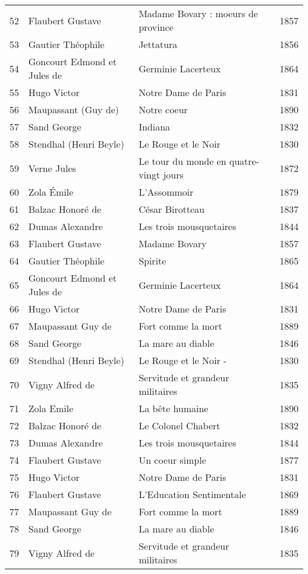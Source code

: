 \begin{center}
\begin{small}
\begin{longtable}{l l l l}
  52 & Flaubert Gustave & Madame Bovary : moeurs de province & 1857 \\
  53 & Gautier Théophile & Jettatura & 1856 \\
  54 & Goncourt Edmond et Jules de & Germinie Lacerteux & 1864 \\
  55 & Hugo Victor & Notre Dame de Paris & 1831 \\
  56 & Maupassant (Guy de) & Notre coeur & 1890 \\
  57 & Sand George & Indiana & 1832 \\
  58 & Stendhal (Henri Beyle) & Le Rouge et le Noir & 1830 \\
  59 & Verne Jules & Le tour du monde en quatre-vingt jours & 1872 \\
  60 & Zola Émile & L’Assommoir & 1879 \\
  61 & Balzac Honoré de & César Birotteau & 1837 \\
  62 & Dumas Alexandre & Les trois mousquetaires & 1844 \\
  63 & Flaubert Gustave & Madame Bovary & 1857 \\
  64 & Gautier Théophile & Spirite & 1865 \\
  65 & Goncourt Edmond et Jules de & Germinie Lacerteux & 1864 \\
  66 & Hugo Victor & Notre Dame de Paris & 1831 \\
  67 & Maupassant Guy de & Fort comme la mort & 1889 \\
  68 & Sand George & La mare au diable & 1846 \\
  69 & Stendhal (Henri Beyle) & Le Rouge et le Noir - & 1830 \\
  70 & Vigny Alfred de & Servitude et grandeur militaires & 1835 \\
  71 & Zola Emile & La bête humaine & 1890 \\
  72 & Balzac Honoré de & Le Colonel Chabert & 1832 \\
  73 & Dumas Alexandre & Les trois mousquetaires & 1844 \\
  74 & Flaubert Gustave & Un coeur simple & 1877 \\
  75 & Hugo Victor & Notre Dame de Paris & 1831 \\
  76 & Flaubert Gustave & L'Education Sentimentale & 1869 \\
  77 & Maupassant Guy de & Fort comme la mort & 1889 \\
  78 & Sand George & La mare au diable & 1846 \\
  79 & Vigny Alfred de & Servitude et grandeur militaires & 1835 \\

\end{longtable}
\end{small}
\end{center}
